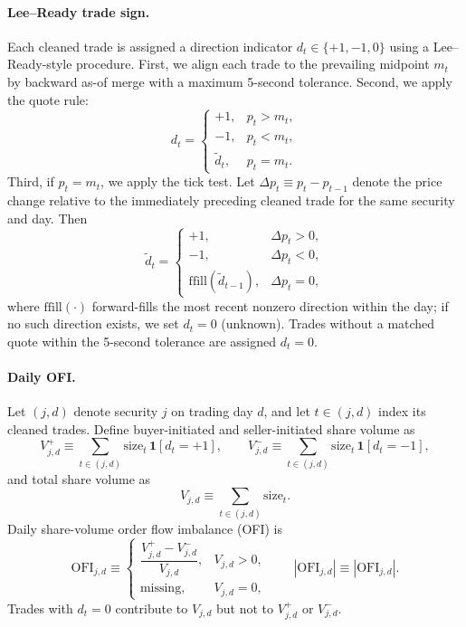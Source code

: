 \paragraph{Lee--Ready trade sign.}
Each cleaned trade is assigned a direction indicator $d_t \in \{+1,-1,0\}$ using a Lee--Ready-style procedure.
First, we align each trade to the prevailing midpoint $m_t$ by backward as-of merge with a maximum 5-second tolerance.
Second, we apply the quote rule:
\[
d_t=
\begin{cases}
+1, & p_t>m_t,\\
-1, & p_t<m_t,\\
\tilde d_t, & p_t=m_t.
\end{cases}
\]
Third, if $p_t=m_t$, we apply the tick test.
Let $\Delta p_t \equiv p_t-p_{t-1}$ denote the price change relative to the immediately preceding cleaned trade for the same security and day. Then
\[
\tilde d_t=
\begin{cases}
+1, & \Delta p_t>0,\\
-1, & \Delta p_t<0,\\
\text{ffill}(\tilde d_{t-1}), & \Delta p_t=0,
\end{cases}
\]
where $\text{ffill}(\cdot)$ forward-fills the most recent nonzero direction within the day; if no such direction exists, we set $d_t=0$ (unknown).
Trades without a matched quote within the 5-second tolerance are assigned $d_t=0$.

\paragraph{Daily OFI.}
Let $(j,d)$ denote security $j$ on trading day $d$, and let $t\in(j,d)$ index its cleaned trades.
Define buyer-initiated and seller-initiated share volume as
\begin{equation}
V_{j,d}^{+} \equiv \sum_{t\in(j,d)} \text{size}_t\,\mathbf{1}[d_t=+1],\qquad
V_{j,d}^{-} \equiv \sum_{t\in(j,d)} \text{size}_t\,\mathbf{1}[d_t=-1],
\end{equation}
and total share volume as
\begin{equation}
V_{j,d} \equiv \sum_{t\in(j,d)} \text{size}_t.
\end{equation}
Daily share-volume order flow imbalance (OFI) is
\begin{equation}
\mathrm{OFI}_{j,d} \equiv
\begin{cases}
\dfrac{V_{j,d}^{+}-V_{j,d}^{-}}{V_{j,d}}, & V_{j,d}>0,\\
\text{missing}, & V_{j,d}=0,
\end{cases}
\qquad
|\mathrm{OFI}_{j,d}| \equiv \left|\mathrm{OFI}_{j,d}\right|.
\end{equation}
Trades with $d_t=0$ contribute to $V_{j,d}$ but not to $V_{j,d}^{+}$ or $V_{j,d}^{-}$.

